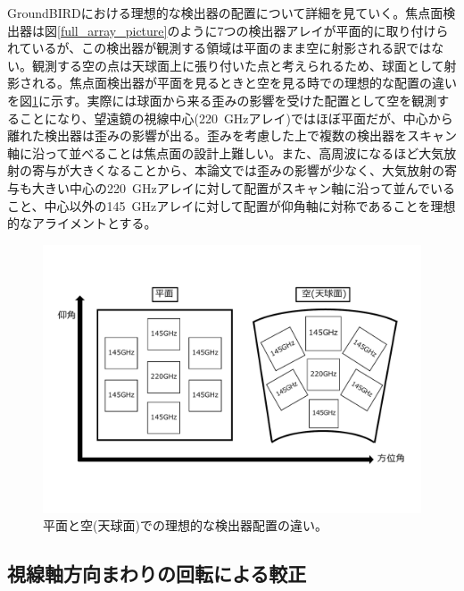 GroundBIRDにおける理想的な検出器の配置について詳細を見ていく。焦点面検出器は図\ref{full_array_picture}のように7つの検出器アレイが平面的に取り付けられているが、この検出器が観測する領域は平面のまま空に射影される訳ではない。観測する空の点は天球面上に張り付いた点と考えられるため、球面として射影される。焦点面検出器が平面を見るときと空を見る時での理想的な配置の違いを図\ref{distortion_pos}に示す。実際には球面から来る歪みの影響を受けた配置として空を観測することになり、望遠鏡の視線中心(\SI{220}{GHz}アレイ)ではほぼ平面だが、中心から離れた検出器は歪みの影響が出る。歪みを考慮した上で複数の検出器をスキャン軸に沿って並べることは焦点面の設計上難しい。また、高周波になるほど大気放射の寄与が大きくなる\cite{atmos_radiation}ことから、本論文では歪みの影響が少なく、大気放射の寄与も大きい中心の\SI{220}{GHz}アレイに対して配置がスキャン軸に沿って並んでいること、中心以外の\SI{145}{GHz}アレイに対して配置が仰角軸に対称であることを理想的なアライメントとする。
\begin{figure}[htbp]
  \centering
  \includegraphics[width=0.8\columnwidth]{5_alignment/figs/distortion_pos2.pdf}
  \caption{平面と空(天球面)での理想的な検出器配置の違い。}
  \label{distortion_pos}
\end{figure}
\subsection{視線軸方向まわりの回転による較正}


